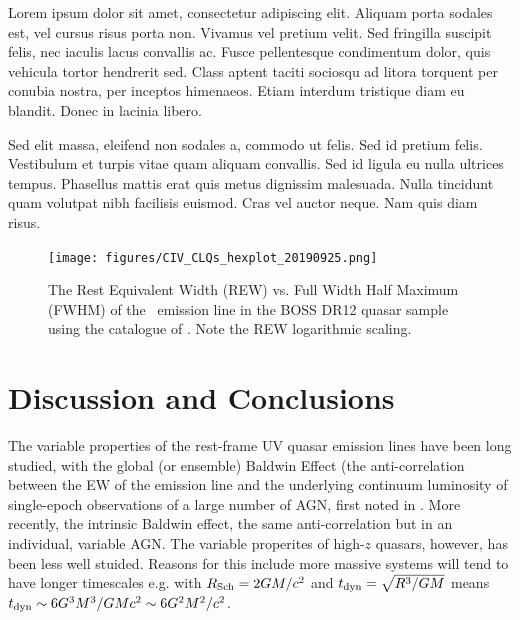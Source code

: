 \documentclass[a4paper,fleqn,usenatbib]{mnras}
\begin{document}
Lorem ipsum dolor sit amet, consectetur adipiscing elit. Aliquam porta
sodales est, vel cursus risus porta non. Vivamus vel pretium
velit. Sed fringilla suscipit felis, nec iaculis lacus convallis
ac. Fusce pellentesque condimentum dolor, quis vehicula tortor
hendrerit sed. Class aptent taciti sociosqu ad litora torquent per
conubia nostra, per inceptos himenaeos. Etiam interdum tristique diam
eu blandit. Donec in lacinia libero.

Sed elit massa, eleifend non sodales a, commodo ut felis. Sed id
pretium felis. Vestibulum et turpis vitae quam aliquam convallis. Sed
id ligula eu nulla ultrices tempus. Phasellus mattis erat quis metus
dignissim malesuada. Nulla tincidunt quam volutpat nibh facilisis
euismod. Cras vel auctor neque. Nam quis diam risus.



\begin{figure}
  \centering
  \texttt{[image: figures/CIV\_CLQs\_hexplot\_20190925.png]}
   \vspace{-12pt}
  \caption[]{The Rest Equivalent Width (REW) vs. Full Width Half Maximum (FWHM) 
of the \civ\ emission line in the BOSS DR12 quasar sample using the catalogue 
of \citet{Hamann2017}. Note the REW logarithmic scaling.}
  \label{fig:REWvsFWHM}
\end{figure}

\section{Discussion and Conclusions}
The variable properties of the rest-frame UV quasar emission lines
have been long studied, with the global (or ensemble) Baldwin Effect
(the anti-correlation between the EW of the emission line and the
underlying continuum luminosity of single-epoch observations of a
large number of AGN, first noted in \citet{Baldwin1977}. 
More recently, the intrinsic Baldwin effect, the same anti-correlation but in an individual, variable AGN.
%
The variable properites of high-$z$ quasars, however, has been less 
well stuided. Reasons for this include more massive systems will tend to 
have longer timescales e.g. with $R_{\rm Sch}= 2GM /c^{2}$ and $t_{\rm dyn} =\sqrt{ R^{3}/GM}$
means   $t_{\rm dyn} \sim 6G^{3} M^{3} / GM c^{2} \sim 6G^{2} M^{2} / c^{2} $.
\end{document}
